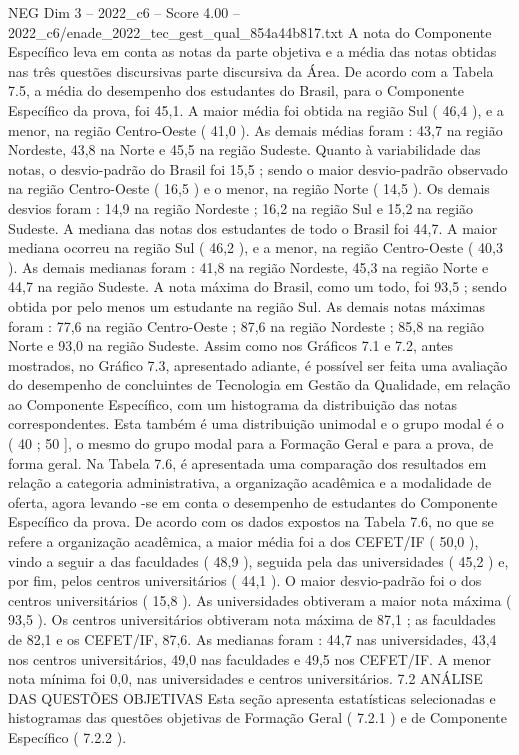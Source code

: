 \begin{textsample}{NEG Dim 3 – 2022\_c6 – Score 4.00 – 2022\_c6/enade\_2022\_tec\_gest\_qual\_854a44b817.txt}
A nota do Componente Específico leva em conta as notas da parte objetiva e a média das notas obtidas nas três questões discursivas parte discursiva da Área.
De acordo com a Tabela 7.5, a média do desempenho dos estudantes do Brasil, para o Componente Específico da prova, foi 45,1.
A maior média foi obtida na região Sul ( 46,4 ), e a menor, na região Centro-Oeste ( 41,0 ).
As demais médias foram : 43,7 na região Nordeste, 43,8 na Norte e 45,5 na região Sudeste.
Quanto à variabilidade das notas, o desvio-padrão do Brasil foi 15,5 ; sendo o maior desvio-padrão observado na região Centro-Oeste ( 16,5 ) e o menor, na região Norte ( 14,5 ).
Os demais desvios foram : 14,9 na região Nordeste ; 16,2 na região Sul e 15,2 na região Sudeste.
A mediana das notas dos estudantes de todo o Brasil foi 44,7.
A maior mediana ocorreu na região Sul ( 46,2 ), e a menor, na região Centro-Oeste ( 40,3 ).
As demais medianas foram : 41,8 na região Nordeste, 45,3 na região Norte e 44,7 na região Sudeste.
A nota máxima do Brasil, como um todo, foi 93,5 ; sendo obtida por pelo menos um estudante na região Sul.
As demais notas máximas foram : 77,6 na região Centro-Oeste ; 87,6 na região Nordeste ; 85,8 na região Norte e 93,0 na região Sudeste.
Assim como nos Gráficos 7.1 e 7.2, antes mostrados, no Gráfico 7.3, apresentado adiante, é possível ser feita uma avaliação do desempenho de concluintes de Tecnologia em Gestão da Qualidade, em relação ao Componente Específico, com um histograma da distribuição das notas correspondentes.
Esta também é uma distribuição unimodal e o grupo modal é o ( 40 ; 50 ], o mesmo do grupo modal para a Formação Geral e para a prova, de forma geral.
Na Tabela 7.6, é apresentada uma comparação dos resultados em relação a categoria administrativa, a organização acadêmica e a modalidade de oferta, agora levando -se em conta o desempenho de estudantes do Componente Específico da prova.
De acordo com os dados expostos na Tabela 7.6, no que se refere a organização acadêmica, a maior média foi a dos CEFET/IF ( 50,0 ), vindo a seguir a das faculdades ( 48,9 ), seguida pela das universidades ( 45,2 ) e, por fim, pelos centros universitários ( 44,1 ).
O maior desvio-padrão foi o dos centros universitários ( 15,8 ).
As universidades obtiveram a maior nota máxima ( 93,5 ).
Os centros universitários obtiveram nota máxima de 87,1 ; as faculdades de 82,1 e os CEFET/IF, 87,6.
As medianas foram : 44,7 nas universidades, 43,4 nos centros universitários, 49,0 nas faculdades e 49,5 nos CEFET/IF.
A menor nota mínima foi 0,0, nas universidades e centros universitários. 7.2 ANÁLISE DAS QUESTÕES OBJETIVAS Esta seção apresenta estatísticas selecionadas e histogramas das questões objetivas de Formação Geral ( 7.2.1 ) e de Componente Específico ( 7.2.2 ).

\end{textsample}
